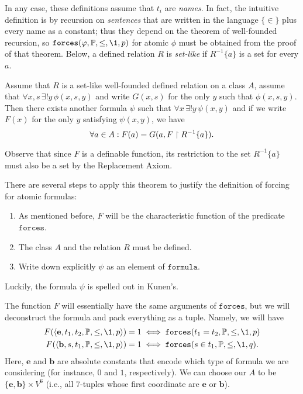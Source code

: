 \documentclass[11pt,english]{article}
\renewcommand{\PP}{\mathbb{P}}
\newcommand{\formula}{\ensuremath{\mathtt{formula}}}
\newcommand{\forceisa}{\mathtt{forces}}
\newcommand{\equ}{\mathbf{e}}
\newcommand{\bel}{\mathbf{b}}
\begin{document}
In any case, these definitions assume that $t_i$ are \emph{names}.
In fact, the intuitive definition is by recursion on \emph{sentences}
that are written in the language $\{\in\}$ plus every name as a
constant; thus they
depend on the theorem of well-founded recursion,
so $\forceisa(\phi,\PP,\leq,\1,p)$ for atomic $\phi$
must be obtained from the proof of that theorem. Below, a defined
relation $R$ is \emph{set-like} if $R^{-1}\{a\}$ is a set for every $a$.
%
\begin{theorem}
  Assume that $R$ is a
  set-like well-founded defined relation on a class $A$, assume that 
  $\forall  x,s\,\exists!y\,\phi(x,s,y)$ and write $G(x,s)$ for the
  only $y$ such that $\phi(x,s,y)$. Then there exists another formula 
   $\psi$ such that $\forall x\,\exists!y\,\psi(x,y)$ and if we write
  $F(x)$ for the only $y$ satisfying $\psi(x,y)$, we have
  \[
  \forall a\in A: F(a) = G(a,F\upharpoonright R^{-1}\{a\}).
  \]
\end{theorem}
%
Observe that since $F$ is a definable function, its restriction to the
set $R^{-1}\{a\}$ must also be a set by the Replacement Axiom.

There are several steps to apply this theorem to justify the
definition of forcing for atomic formulas:
\begin{enumerate}
\item As mentioned before, $F$ will be the characteristic function of
  the predicate $\forceisa$.
\item The class $A$ and the relation $R$ must be
  defined.
\item Write down explicitly $\psi$ as an element of
  $\formula$. 
\end{enumerate}
%
Luckily, the formula $\psi$ is spelled out in Kunen's.

The  function $F$ will essentially have 
the same  arguments  of $\forceisa$, but we will deconstruct the
formula and pack everything as a tuple. Namely, we will have
\begin{align}
  F(\lb\equ,t_1,t_2,\PP,\leq,\1,p\rb) =1 &\iff  
  \forceisa(t_1=t_2,\PP,\leq,\1,p) \label{eq:forcing-F-equ}\\
  F(\lb\bel,s,t_1,\PP,\leq,\1,p\rb) =1 &\iff  
  \forceisa(s\in t_1,\PP,\leq,\1,q). \label{eq:forcing-F-bel}
\end{align}
Here, $\equ$ and $\bel$ are absolute constants that encode which type of
formula we are considering (for instance, $0$ and $1$, 
respectively). We can choose our $A$ to be 
$\{\equ,\bel\}\times V^6$ (i.e., all 7-tuples whose first coordinate
are  $\equ$ or $\bel$).
\end{document}
